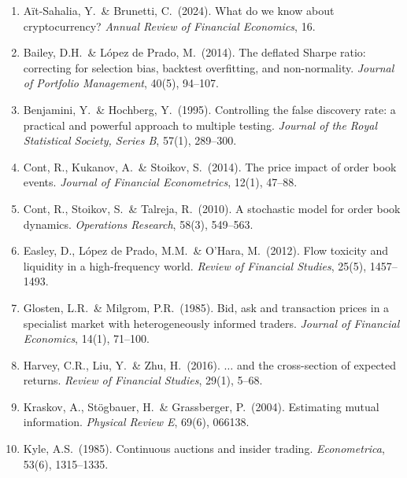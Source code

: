 \documentclass[11pt,a4paper]{article}
\theoremstyle{definition}
\theoremstyle{plain}
\begin{document}
\begin{enumerate}
  \item A\"it-Sahalia, Y.\ \& Brunetti, C.\ (2024). What do we know about cryptocurrency?
        \textit{Annual Review of Financial Economics}, 16.

  \item Bailey, D.H.\ \& L\'opez de Prado, M.\ (2014). The deflated Sharpe ratio: correcting for
        selection bias, backtest overfitting, and non-normality. \textit{Journal of Portfolio
        Management}, 40(5), 94--107.

  \item Benjamini, Y.\ \& Hochberg, Y.\ (1995). Controlling the false discovery rate: a practical
        and powerful approach to multiple testing. \textit{Journal of the Royal Statistical
        Society, Series B}, 57(1), 289--300.

  \item Cont, R., Kukanov, A.\ \& Stoikov, S.\ (2014). The price impact of order book events.
        \textit{Journal of Financial Econometrics}, 12(1), 47--88.

  \item Cont, R., Stoikov, S.\ \& Talreja, R.\ (2010). A stochastic model for order book dynamics.
        \textit{Operations Research}, 58(3), 549--563.

  \item Easley, D., L\'opez de Prado, M.M.\ \& O'Hara, M.\ (2012). Flow toxicity and liquidity in a
        high-frequency world. \textit{Review of Financial Studies}, 25(5), 1457--1493.

  \item Glosten, L.R.\ \& Milgrom, P.R.\ (1985). Bid, ask and transaction prices in a specialist
        market with heterogeneously informed traders. \textit{Journal of Financial Economics},
        14(1), 71--100.

  \item Harvey, C.R., Liu, Y.\ \& Zhu, H.\ (2016). $\ldots$ and the cross-section of expected
        returns. \textit{Review of Financial Studies}, 29(1), 5--68.

  \item Kraskov, A., St\"ogbauer, H.\ \& Grassberger, P.\ (2004). Estimating mutual information.
        \textit{Physical Review E}, 69(6), 066138.

  \item Kyle, A.S.\ (1985). Continuous auctions and insider trading. \textit{Econometrica}, 53(6),
        1315--1335.


\end{enumerate}
\end{document}
